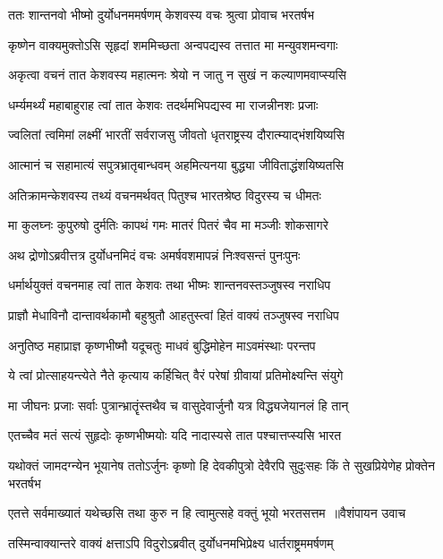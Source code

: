 \twolineshloka
{ततः शान्तनवो भीष्मो दुर्योधनममर्षणम्}
{केशवस्य वचः श्रुत्वा प्रोवाच भरतर्षभ}


\threelineshloka
{कृष्णेन वाक्यमुक्तोऽसि सृहृदां शममिच्छता}
{अन्वपद्यस्व तत्तात मा मन्युवशमन्वगाः}
{}


\twolineshloka
{अकृत्वा वचनं तात केशवस्य महात्मनः}
{श्रेयो न जातु न सुखं न कल्याणमवाप्स्यसि}


\twolineshloka
{धर्म्यमर्थ्यं महाबाहुराह त्वां तात केशवः}
{तदर्थमभिपद्यस्व मा राजन्नीनशः प्रजाः}


\twolineshloka
{ज्वलितां त्वमिमां लक्ष्मीं भारतीं सर्वराजसु}
{जीवतो धृतराष्ट्रस्य दौरात्म्याद्भंशयिष्यसि}


\twolineshloka
{आत्मानं च सहामात्यं सपुत्रभ्रातृबान्धवम्}
{अहमित्यनया बुद्ध्या जीविताद्धंशयिष्यतसि}


\twolineshloka
{अतिक्रामन्केशवस्य तथ्यं वचनमर्थवत्}
{पितुश्च भारतश्रेष्ठ विदुरस्य च धीमतः}


\twolineshloka
{मा कुलघ्नः कुपुरुषो दुर्मतिः कापथं गमः}
{मातरं पितरं चैव मा मञ्जीः शोकसागरे}


\twolineshloka
{अथ द्रोणोऽब्रवीत्तत्र दुर्योधनमिदं वचः}
{अमर्षवशमापन्नं निःश्वसन्तं पुनःपुनः}


\twolineshloka
{धर्मार्थयुक्तं वचनमाह त्वां तात केशवः}
{तथा भीष्मः शान्तनवस्तञ्जुषस्व नराधिप}


\twolineshloka
{प्राज्ञौ मेधाविनौ दान्तावर्थकामौ बहुश्रुतौ}
{आहतुस्त्वां हितं वाक्यं तञ्जुषस्व नराधिप}


\twolineshloka
{अनुतिष्ठ महाप्राज्ञ कृष्णभीष्मौ यदूचतुः}
{माधवं बुद्धिमोहेन माऽवमंस्थाः परन्तप}


\twolineshloka
{ये त्वां प्रोत्साहयन्त्येते नैते कृत्याय कर्हिचित्}
{वैरं परेषां ग्रीवायां प्रतिमोक्ष्यन्ति संयुगे}


\twolineshloka
{मा जीघनः प्रजाः सर्वाः पुत्रान्भ्रातॄंस्तथैव च}
{वासुदेवार्जुनौ यत्र विद्ध्यजेयानलं हि तान्}


\twolineshloka
{एतच्चैव मतं सत्यं सुहृदोः कृष्णभीष्मयोः}
{यदि नादास्यसे तात पश्चात्तप्स्यसि भारत}


\threelineshloka
{यथोक्तं जामदग्न्येन भूयानेष ततोऽर्जुनः}
{कृष्णो हि देवकीपुत्रो देवैरपि सुदुःसहः}
{किं ते सुखप्रियेणेह प्रोक्तेन भरतर्षभ}


\threelineshloka
{एतत्ते सर्वमाख्यातं यथेच्छसि तथा कुरु}
{न हि त्वामुत्सहे वक्तुं भूयो भरतसत्तम ॥वैशंपायन उवाच}
{}


\twolineshloka
{तस्मिन्वाक्यान्तरे वाक्यं क्षत्ताऽपि विदुरोऽब्रवीत्}
{दुर्योधनमभिप्रेक्ष्य धार्तराष्ट्रममर्षणम्}



